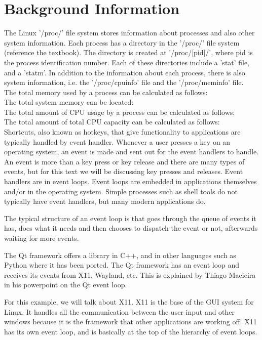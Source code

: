 \documentclass[12pt]{article}
\begin{document}
	\section{Background Information}
	The Linux '/proc/' file system stores information about processes and also other system information. Each process has a directory in the '/proc/' file system (reference the textbook). The directory is created at '/proc/[pid]/', where pid is the process identification number. Each of these directories include a 'stat' file, and a 'statm'. In addition to the information about each process, there is also system information, i.e. the '/proc/cpuinfo' file and the '/proc/meminfo' file.\\
	The total memory used by a process can be calculated as follows:\\
	The total system memory can be located:\\
	The total amount of CPU usage by a process can be calculated as follows:\\
	The total amount of total CPU capacity can be calculated as follows:\\
	
Shortcuts, also known as hotkeys, that give functionality to applications are typically handled by event handler. Whenever a user presses a key on an operating system, an event is made and sent out for the event handlers to handle. An event is more than a key press or key release and there are many types of events, but for this text we will be discussing key presses and releases. Event handlers are in event loops. Event loops are embedded in applications themselves and/or in the operating system. Simple processes such as shell tools do not typically have event handlers, but many modern applications do.

The typical structure of an event loop is that goes through the queue of events it has, does what it needs and then chooses to dispatch the event or not, afterwards waiting for more events. 

The Qt framework offers a library in C++, and in other languages such as Python where it has been ported.
The Qt framework has an event loop and receives its events from X11, Wayland, etc.
This is explained by Thiago Macieira in his powerpoint on the Qt event loop\cite{QtSlides}.

For this example, we will talk about X11.
X11 is the base of the GUI system for Linux.
It handles all the communication between the user input and other windows because it is the framework that other applications are working off.
X11 has its own event loop, and is basically at the top of the hierarchy of event loops.
\end{document}
